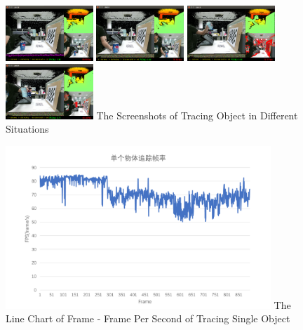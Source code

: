 \begin{figure}[!htp]
  \centering
  \includegraphics[width=3.3cm]{figure/beforeT.png}
  \hspace{0.1cm}
    \includegraphics[width=3.3cm]{figure/noT.png}
  \hspace{0.1cm}
    \includegraphics[width=3.3cm]{figure/staticT.png}
  \hspace{0.1cm}
  \includegraphics[width=3.3cm]{figure/movingT.png}
    {The Screenshots of Tracing Object in Different Situations}
  \label{fig:SRR}
\end{figure}


\begin{figure}[!htp]
  \centering
  \includegraphics[width=10cm]{figure/fps.png}
    {The Line Chart of Frame - Frame Per Second of Tracing Single Object }
 \label{fig:fps}
\end{figure}

